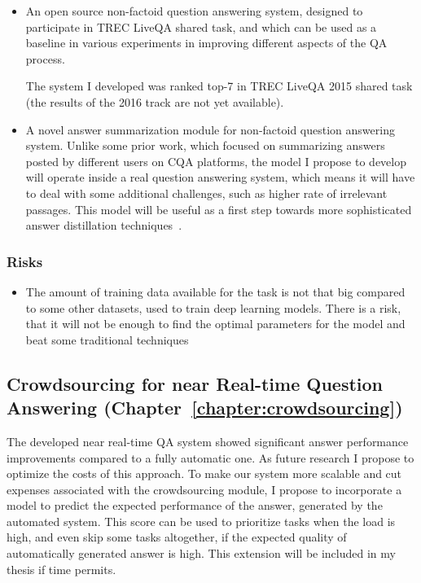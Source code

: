 \begin{itemize}
\item An open source non-factoid question answering system, designed to participate in TREC LiveQA shared task, and which can be used as a baseline in various experiments in improving different aspects of the QA process.

The system I developed was ranked top-7 in TREC LiveQA 2015 shared task (the results of the 2016 track are not yet available).

\item A novel answer summarization module for non-factoid question answering system.
Unlike some prior work, which focused on summarizing answers posted by different users on CQA platforms, the model I propose to develop will operate inside a real question answering system, which means it will have to deal with some additional challenges, such as higher rate of irrelevant passages.
This model will be useful as a first step towards more sophisticated answer distillation techniques~\cite{mitra2016distillation}.

\end{itemize}

\subsubsection{Risks}
\label{section:proposal:plan:non-factoid:risks}

\begin{itemize}
\item The amount of training data available for the task is not that big compared to some other datasets, used to train deep learning models. There is a risk, that it will not be enough to find the optimal parameters for the model and beat some traditional techniques
\end{itemize}

\subsection{Crowdsourcing for near Real-time Question Answering (Chapter~\ref{chapter:crowdsourcing})}
\label{section:proposal:plan:crowdsourcing}

The developed near real-time QA system showed significant answer performance improvements compared to a fully automatic one.
As future research I propose to optimize the costs of this approach.
To make our system more scalable and cut expenses associated with the crowdsourcing module, I propose to incorporate a model to predict the expected performance of the answer, generated by the automated system.
This score can be used to prioritize tasks when the load is high, and even skip some tasks altogether, if the expected quality of automatically generated answer is high.
This extension will be included in my thesis if time permits.

